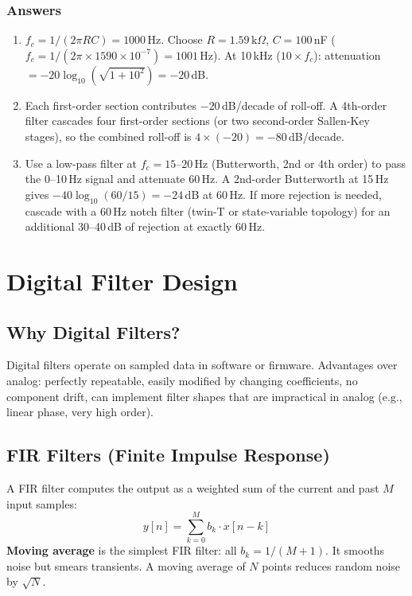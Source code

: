 \documentclass[11pt,letterpaper,twoside,openany]{book}
\begin{document}
\subsection{Answers}
\begin{enumerate}[leftmargin=1.5em]
\item $f_c = 1/(2\pi RC) = 1000$\,Hz. Choose $R = 1.59\,\text{k}\Omega$, $C = 100$\,nF ($f_c = 1/(2\pi \times 1590 \times 10^{-7}) = 1001$\,Hz). At 10\,kHz ($10 \times f_c$): attenuation $= -20\log_{10}(\sqrt{1 + 10^2}) = -20$\,dB.
\item Each first-order section contributes $-20$\,dB/decade of roll-off. A 4th-order filter cascades four first-order sections (or two second-order Sallen-Key stages), so the combined roll-off is $4 \times (-20) = -80$\,dB/decade.
\item Use a low-pass filter at $f_c = 15$--$20$\,Hz (Butterworth, 2nd or 4th order) to pass the 0--10\,Hz signal and attenuate 60\,Hz. A 2nd-order Butterworth at 15\,Hz gives $-40\log_{10}(60/15) = -24$\,dB at 60\,Hz. If more rejection is needed, cascade with a 60\,Hz notch filter (twin-T or state-variable topology) for an additional 30--40\,dB of rejection at exactly 60\,Hz.
\end{enumerate}


\chapter{Digital Filter Design}
\label{ch:digital_filters}

\section{Why Digital Filters?}
Digital filters operate on sampled data in software or firmware. Advantages over analog: perfectly repeatable, easily modified by changing coefficients, no component drift, can implement filter shapes that are impractical in analog (e.g., linear phase, very high order).

\section{FIR Filters (Finite Impulse Response)}
A FIR filter computes the output as a weighted sum of the current and past $M$ input samples:
\begin{equation}
y[n] = \sum_{k=0}^{M} b_k \cdot x[n-k]
\end{equation}
\textbf{Moving average} is the simplest FIR filter: all $b_k = 1/(M+1)$. It smooths noise but smears transients. A moving average of $N$ points reduces random noise by $\sqrt{N}$.
\end{document}
